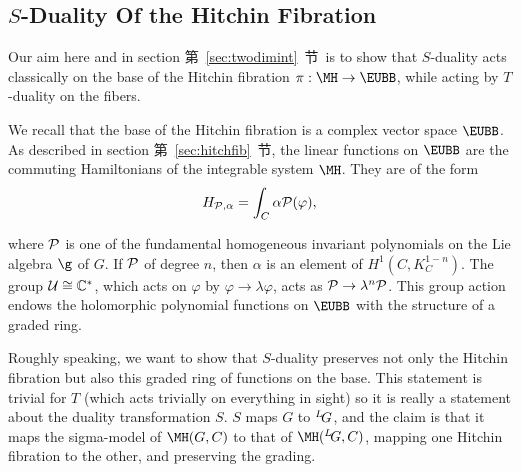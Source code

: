 
\subsection{$S$-Duality Of the Hitchin Fibration}

\label{sec:sdualhitfib}

Our aim here and in section 第~\ref{sec:twodimint}~节\ is to show that
$S$-duality acts classically on the base of the Hitchin fibration
$\pi:\MH\to {\EUBB}$, while acting by $T$-duality on the fibers.

We recall that the base of the Hitchin fibration is a complex
vector space ${\EUBB}$. As described in section 第~\ref{sec:hitchfib}~节, the
linear functions on ${\EUBB}$ are the commuting Hamiltonians of
the integrable system $\MH$. They are of the form
\setcounter{equation}{36}
\begin{equation}\label{eq:utyr}
H_{{\cal P},\alpha}=\int_C\alpha {\cal P}(\varphi),
\end{equation}

where ${\cal P}$ is one of the fundamental homogeneous invariant
polynomials on the Lie algebra $\g$ of $G$. If ${\cal P}$  of
degree $n$, then $\alpha$ is an element of $H^1(C,K_C^{1-n})$. The
group ${\cal U}\cong \Bbb{C}^*$, which acts on $\varphi$ by
$\varphi\to\lambda\varphi$, acts as ${\cal P}\to \lambda^n{\cal
P}$.  This group action endows the holomorphic polynomial
functions on ${\EUBB}$ with the structure of a graded ring.

Roughly speaking, we want to show that $S$-duality preserves not
only the Hitchin fibration but also this graded ring of functions
on the base.  This statement is trivial for $T$ (which acts
trivially on everything in sight) so it is really a statement
about the duality transformation $S$.  $S$  maps $G$ to
$^L\negthinspace G$, and the claim is that it maps the sigma-model
of $\MH(G,C)$ to that of $\MH(^L\negthinspace G,C)$, mapping one
Hitchin fibration to the other, and preserving the grading.

